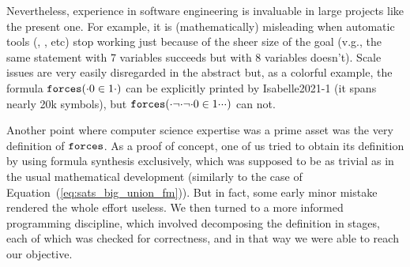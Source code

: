 Nevertheless, experience  in software engineering is invaluable in
large projects like the present one. For example, it is
(mathematically) misleading when automatic tools (,
, etc) stop working just because of the sheer size of the
goal (v.g., the same statement with 7 variables succeeds but with 8
variables doesn't). Scale issues are very easily disregarded in the
abstract but, as a colorful example, the formula $\mathop{\mathtt{forces}}({\cdot}0\in 1{\cdot})$
can be explicitly printed by Isabelle2021-1 (it spans nearly 20k symbols), but
$\mathop{\mathtt{forces}}({\cdot}\neg{\cdot}\neg{\cdot}0\in 1{\cdot}{\cdot}{\cdot})$
can not.

Another point where computer science expertise was a prime asset was
the very definition of $\mathop{\mathtt{forces}}$. As a
proof of concept, one of us tried to obtain its definition by
using formula synthesis exclusively, which was supposed to be as
trivial as in the usual
mathematical development (similarly to the case of
Equation~(\ref{eq:sats_big_union_fm})).
But in fact, some early minor mistake
rendered the whole effort useless. We then turned to a more
informed programming discipline, which involved decomposing the
definition in stages, each of which was checked for correctness, and
in that way we were able to reach our objective.



